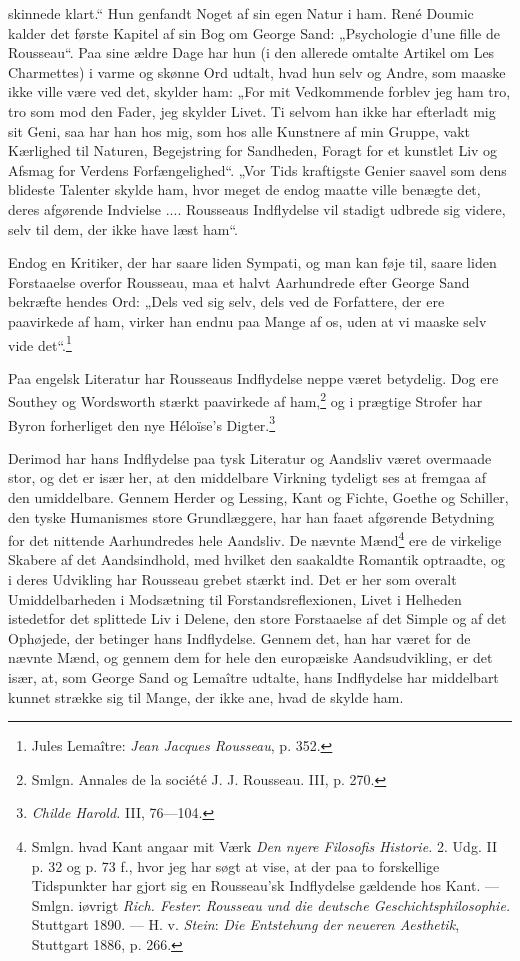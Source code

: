 \documentclass[12pt,a4paper,openany]{book}
\newcommand{\opage}[1]{\marginnote{\footnotesize\textit{[#1]}}}
\begin{document}
skinnede klart.“ Hun genfandt Noget af sin egen Natur i ham.
René Doumic kalder det første Kapitel af sin Bog om George
Sand: „Psychologie d’une fille de Rousseau“. Paa sine ældre
Dage har hun (i den allerede omtalte Artikel om Les Charmettes)
i varme og skønne Ord udtalt, hvad hun selv og Andre,
som maaske ikke ville være ved det, skylder ham: „For mit Vedkommende
forblev jeg ham tro, tro som mod den Fader, jeg
skylder Livet. Ti selvom han ikke har efterladt mig sit Geni,
saa har han hos mig, som hos alle Kunstnere af min Gruppe,
vakt Kærlighed til Naturen, Begejstring for Sandheden, Foragt
for et kunstlet Liv og Afsmag for Verdens Forfængelighed“. „Vor
Tids kraftigste Genier saavel som dens blideste Talenter skylde
ham, hvor meget de endog maatte ville benægte det, deres afgørende
Indvielse .... Rousseaus Indflydelse vil stadigt udbrede
sig videre, selv til dem, der ikke have læst ham“.

Endog en Kritiker, der har saare liden Sympati, og man
kan føje til, saare liden Forstaaelse overfor Rousseau, maa et
halvt Aarhundrede efter George Sand bekræfte hendes Ord:
„Dels ved sig selv, dels ved de Forfattere, der ere paavirkede
af ham, virker han endnu paa Mange af os, uden at vi maaske
selv vide det“.\footnote[1]{Jules Lemaître: \textit{Jean Jacques Rousseau}, p. 352.}

Paa engelsk Literatur har Rousseaus Indflydelse neppe været
betydelig. Dog ere Southey og Wordsworth stærkt paavirkede
af ham,\footnote[2]{Smlgn. Annales de la société J. J. Rousseau. III, p. 270.} og i prægtige Strofer har Byron forherliget den nye
Héloïse’s Digter.\footnote[3]{\textit{Childe Harold.} III, 76---104.}

Derimod har hans Indflydelse paa tysk Literatur og Aandsliv
været overmaade stor, og det er især her, at den middelbare
Virkning tydeligt ses at fremgaa af den umiddelbare. Gennem
Herder og Lessing, Kant og Fichte, Goethe og Schiller, den
tyske Humanismes store Grundlæggere, har han faaet afgørende
\setcounter{footnote}{0}%
\opage{124}Betydning for det nittende Aarhundredes hele Aandsliv. De
nævnte Mænd\footnote[1]{Smlgn. hvad Kant angaar mit Værk \textit{Den nyere Filosofis Historie.} 2. Udg. II p. 32 og p. 73 f., hvor jeg har søgt at vise, at der paa to forskellige Tidspunkter har gjort sig en Rousseau’sk Indflydelse gældende hos Kant. --- Smlgn. iøvrigt \emph{Rich. Fester}: \textit{Rousseau und die deutsche Geschichtsphilosophie.} Stuttgart 1890. --- H. v. \emph{Stein}: \textit{Die Entstehung der neueren Aesthetik}, Stuttgart 1886, p. 266.} ere de virkelige Skabere af det Aandsindhold,
med hvilket den saakaldte Romantik optraadte, og i deres Udvikling
har Rousseau grebet stærkt ind. Det er her som overalt
Umiddelbarheden i Modsætning til Forstandsreflexionen, Livet i
Helheden istedetfor det splittede Liv i Delene, den store Forstaaelse
af det Simple og af det Ophøjede, der betinger hans
Indflydelse. Gennem det, han har været for de nævnte Mænd,
og gennem dem for hele den europæiske Aandsudvikling, er
det især, at, som George Sand og Lemaître udtalte, hans Indflydelse
har middelbart kunnet strække sig til Mange, der ikke
ane, hvad de skylde ham.
\end{document}
